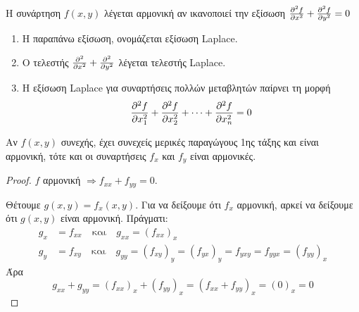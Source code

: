 \begin{dfn}
  Η συνάρτηση $ f(x,y) $ λέγεται αρμονική αν ικανοποιεί την εξίσωση 
  $ \pdv[2]{f}{x} + \pdv[2]{f}{y} = 0 $ 
\end{dfn}

\begin{rem}
\item {}
  \begin{enumerate}
    \item Η παραπάνω εξίσωση, ονομάζεται εξίσωση Laplace.
    \item Ο τελεστής $ \pdv[2]{}{x} + \pdv[2]{}{y} $ λέγεται τελεστής 
      Laplace.
    \item Η εξίσωση Laplace για συναρτήσεις πολλών μεταβλητών παίρνει τη 
      μορφή
      \[
        \pdv[2]{f}{x_{1}} + \pdv[2]{f}{x_{2}} + \cdots + 
        \pdv[2]{f}{x_{n}}=0 
      \] 
  \end{enumerate}
\end{rem}

\begin{prop}
\item {}
  Αν $ f(x,y) $ συνεχής, έχει συνεχείς μερικές παραγώγους 1ης τάξης 
  και είναι αρμονική, τότε και οι συναρτήσεις $ f_{x} $ και $ f_{y} $
  είναι αρμονικές. 
\end{prop}
\begin{proof}
\item {}
  $f$ αρμονική $ \Rightarrow f_{xx}+f_{yy}=0 $.

  Θέτουμε $ g(x,y)=f_{x}(x,y) $. Για να δείξουμε ότι $ f_{x} $ αρμονική, 
  αρκεί να δείξουμε ότι $ g(x,y) $ είναι αρμονική. Πράγματι:
  \begin{align*}
    g_{x} &= f_{xx} \quad \text{και} \quad g_{xx} = (f_{xx})_{x} \\ 
    g_{y} &= f_{xy} \quad \text{και} \quad g_{yy} = (f_{xy})_{y} =
    (f_{yx})_{y} = f_{yxy} = f_{yyx} = (f_{yy})_{x}
  \end{align*}
  Άρα 
  \[
    g_{xx}+g_{yy} = (f_{xx})_{x} + (f_{yy})_{x} = 
    (f_{xx}+f_{yy})_{x}= (0)_{x} =0
  \] 
\end{proof}

